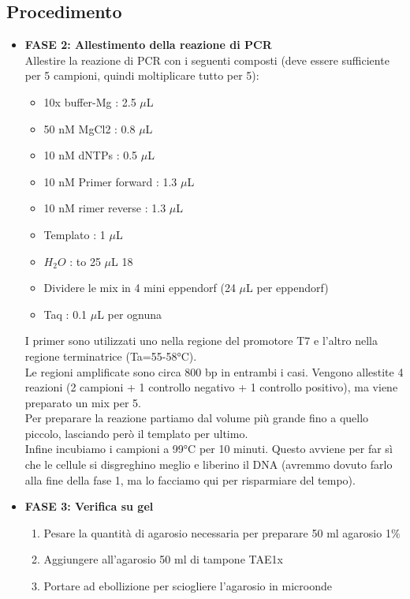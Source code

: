 \documentclass{extarticle}
\begin{document}
\subsection*{Procedimento}
\begin{itemize}
    \item{}\textbf{FASE 2: Allestimento della reazione di PCR}\\
    Allestire la reazione di PCR con i seguenti composti (deve essere sufficiente per 5 campioni, quindi moltiplicare tutto per 5):
    \begin{itemize}
        \item 10x buffer-Mg : 2.5 $\mu$L
        \item 50 nM MgCl2 : 0.8 $\mu$L 
        \item 10 nM dNTPs : 0.5 $\mu$L 
        \item 10 nM Primer forward : 1.3 $\mu$L
        \item 10 nM rimer reverse : 1.3 $\mu$L 
        \item Templato : 1 $\mu$L
        \item $H_{2}O$ : to 25 $\mu$L 18 
        \item Dividere le mix in 4 mini eppendorf (24 $\mu$L per eppendorf)
        \item Taq : 0.1 $\mu$L per ognuna
    \end{itemize}
    I primer sono utilizzati uno nella regione del promotore T7 e l'altro nella regione terminatrice (Ta=55-58°C).\\
    Le regioni amplificate sono circa 800 bp in entrambi i casi. Vengono allestite 4 reazioni (2 campioni + 1 controllo negativo + 1 controllo positivo), ma viene preparato un mix per 5.\\
    Per preparare la reazione partiamo dal volume più grande fino a quello piccolo, lasciando però il templato per ultimo.\\
    Infine incubiamo i campioni a 99°C per 10 minuti. Questo avviene per far sì che le cellule si disgreghino meglio e liberino il DNA (avremmo dovuto farlo alla fine della fase 1, ma lo facciamo qui per risparmiare del tempo).
    \item{} \textbf{FASE 3: Verifica su gel }
    \begin{enumerate}
        \item Pesare la quantità di agarosio necessaria per preparare 50 ml agarosio 1$\%$
        \item Aggiungere all'agarosio 50 ml di tampone TAE1x 
        \item Portare ad ebollizione per sciogliere l'agarosio in microonde 

\end{enumerate}
\end{itemize}
\end{document}
